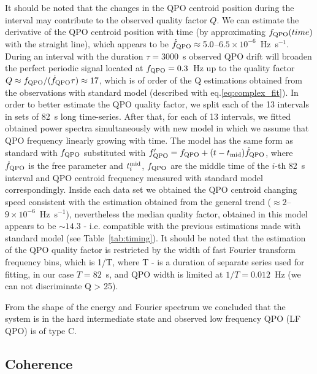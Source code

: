 \documentclass[a4paper,fleqn,usenatbib]{mnras}
\begin{document}
It should be noted that the changes in the QPO centroid position during the interval may contribute to the observed quality factor $Q$.
We can estimate the derivative of the QPO centroid position with time (by approximating $f_{\rm QPO}(time)$ with the straight line), which appears to be $\dot{f}_{\rm QPO} \approx 5.0$--$6.5\times10^{-6}$~Hz~s$^{-1}$. 
During an interval with the duration $\tau = 3000$~s observed QPO drift will broaden the perfect periodic signal located at $f_{\rm QPO}=0.3$~Hz up to the quality factor $Q \approx f_{\rm QPO}/(\dot{f}_{\rm QPO}\tau) \approx 17$, which is of order of the Q estimations obtained from the observations with standard model (described with eq.\ref{eq:complex_fit}).
In order to better estimate the QPO quality factor, we split each of the 13 intervals in sets of 82~s long time-series. 
After that, for each of 13 intervals, we fitted obtained power spectra simultaneously with new model in which we assume that QPO frequency linearly growing with time. 
The model has the same form as standard with $f_{\rm QPO}$ substituted with $f_{\rm QPO}' = f_{\rm QPO} + (t - t_{\rm mid})\dot{f}_{\rm QPO}$, where $\dot{f}_{\rm QPO}$ is the free parameter and $t_{i}^{\rm mid}$, $f_{\rm QPO}$ are the middle time of the $i$-th 82~s interval and QPO centroid frequency measured with standard model correspondingly.
Inside each data set we obtained the QPO centroid changing speed consistent with the estimation obtained from the general trend ($\approx 2$--$9\times10^{-6}$~Hz~s$^{-1}$), nevertheless the median quality factor, obtained in this model appears to be $\sim14.3$ - i.e. compatible with the previous estimations made with standard model (see Table~\ref{tab:timing}). 
It should be noted that the estimation of the QPO quality factor is restricted by the width of fast Fourier transform frequency bins, which is 1/T, where T - is a duration of separate series used for fitting, in our case $T=82$~s, and QPO width is limited at $1/T = 0.012$~Hz (we can not discriminate Q > 25).

From the shape of the energy and Fourier spectrum we concluded that the system is in the hard intermediate state and observed low frequency QPO (LF QPO) is of type C. 

\subsection{Coherence}
\end{document}
